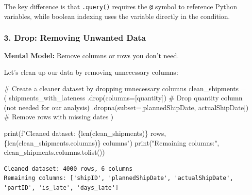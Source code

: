 \documentclass[
  letterpaper,
  DIV=11,
  numbers=noendperiod]{scrartcl}
\newenvironment{Shaded}{\begin{snugshade}}{\end{snugshade}}
\newcommand{\BuiltInTok}[1]{\textcolor[rgb]{0.00,0.23,0.31}{#1}}
\newcommand{\CommentTok}[1]{\textcolor[rgb]{0.37,0.37,0.37}{#1}}
\newcommand{\NormalTok}[1]{\textcolor[rgb]{0.00,0.23,0.31}{#1}}
\newcommand{\OperatorTok}[1]{\textcolor[rgb]{0.37,0.37,0.37}{#1}}
\newcommand{\SpecialCharTok}[1]{\textcolor[rgb]{0.37,0.37,0.37}{#1}}
\newcommand{\SpecialStringTok}[1]{\textcolor[rgb]{0.13,0.47,0.30}{#1}}
\newcommand{\StringTok}[1]{\textcolor[rgb]{0.13,0.47,0.30}{#1}}
\begin{document}
The key difference is that \texttt{.query()} requires the \texttt{@}
symbol to reference Python variables, while boolean indexing uses the
variable directly in the condition.

\subsubsection{3. Drop: Removing Unwanted
Data}\label{drop-removing-unwanted-data}

\textbf{Mental Model:} Remove columns or rows you don't need.

Let's clean up our data by removing unnecessary columns:

\label{mental-model-3-drop}
\begin{Shaded}
\begin{Highlighting}[]
\CommentTok{\# Create a cleaner dataset by dropping unnecessary columns}
\NormalTok{clean\_shipments }\OperatorTok{=}\NormalTok{ (}
\NormalTok{    shipments\_with\_lateness}
\NormalTok{    .drop(columns}\OperatorTok{=}\NormalTok{[}\StringTok{\textquotesingle{}quantity\textquotesingle{}}\NormalTok{])  }\CommentTok{\# Drop quantity column (not needed for our analysis)}
\NormalTok{    .dropna(subset}\OperatorTok{=}\NormalTok{[}\StringTok{\textquotesingle{}plannedShipDate\textquotesingle{}}\NormalTok{, }\StringTok{\textquotesingle{}actualShipDate\textquotesingle{}}\NormalTok{])  }\CommentTok{\# Remove rows with missing dates}
\NormalTok{)}

\BuiltInTok{print}\NormalTok{(}\SpecialStringTok{f"Cleaned dataset: }\SpecialCharTok{\{}\BuiltInTok{len}\NormalTok{(clean\_shipments)}\SpecialCharTok{\}}\SpecialStringTok{ rows, }\SpecialCharTok{\{}\BuiltInTok{len}\NormalTok{(clean\_shipments.columns)}\SpecialCharTok{\}}\SpecialStringTok{ columns"}\NormalTok{)}
\BuiltInTok{print}\NormalTok{(}\StringTok{"Remaining columns:"}\NormalTok{, clean\_shipments.columns.tolist())}
\end{Highlighting}
\end{Shaded}

\begin{verbatim}
Cleaned dataset: 4000 rows, 6 columns
Remaining columns: ['shipID', 'plannedShipDate', 'actualShipDate', 'partID', 'is_late', 'days_late']
\end{verbatim}
\end{document}
